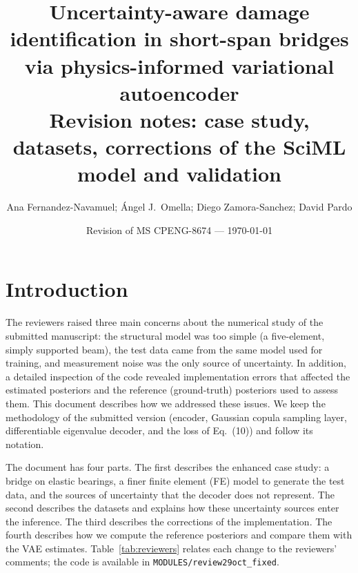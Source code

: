 \documentclass[11pt]{article}
\title{\sffamily\bfseries Uncertainty-aware damage identification in short-span bridges via physics-informed variational autoencoder\\[4pt]
\large Revision notes: case study, datasets, corrections of the SciML model and validation}
\author{Ana Fernandez-Navamuel; \'Angel J.\ Omella; Diego Zamora-Sanchez; David Pardo}
\date{Revision of MS CPENG-8674 --- \today}
\begin{document}
\maketitle

\section{Introduction}

The reviewers raised three main concerns about the numerical study of the submitted manuscript: the structural model
was too simple (a five-element, simply supported beam), the test data came from the same model used for training,
and measurement noise was the only source of uncertainty. In addition, a detailed inspection of the code revealed
implementation errors that affected the estimated posteriors and the reference (ground-truth) posteriors used to
assess them. This document describes how we addressed these issues. We keep the methodology of the submitted version
(encoder, Gaussian copula sampling layer, differentiable eigenvalue decoder, and the loss of Eq.~(10)) and follow its
notation.

The document has four parts. The first describes the enhanced case study: a bridge on elastic bearings, a finer
finite element (FE) model to generate the test data, and the sources of uncertainty that the decoder does not
represent. The second describes the datasets and explains how these uncertainty sources enter the inference. The
third describes the corrections of the implementation. The fourth describes how we compute the reference posteriors
and compare them with the VAE estimates. Table~\ref{tab:reviewers} relates each change to the reviewers' comments;
the code is available in \texttt{MODULES/review29oct\_fixed}.
\end{document}
